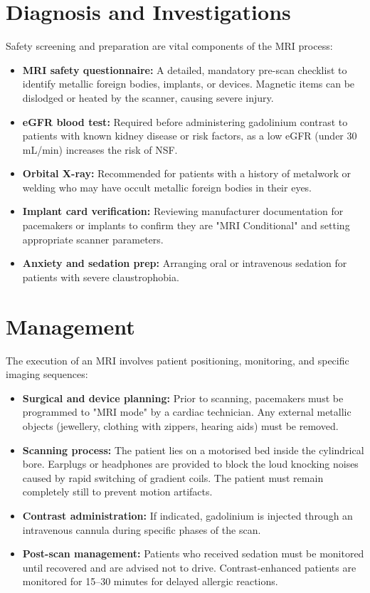 \section*{Diagnosis and Investigations}
Safety screening and preparation are vital components of the MRI process:
\begin{itemize}
    \item \textbf{MRI safety questionnaire:} A detailed, mandatory pre-scan checklist to identify metallic foreign bodies, implants, or devices. Magnetic items can be dislodged or heated by the scanner, causing severe injury.
    \item \textbf{eGFR blood test:} Required before administering gadolinium contrast to patients with known kidney disease or risk factors, as a low eGFR (under 30 mL/min) increases the risk of NSF.
    \item \textbf{Orbital X-ray:} Recommended for patients with a history of metalwork or welding who may have occult metallic foreign bodies in their eyes.
    \item \textbf{Implant card verification:} Reviewing manufacturer documentation for pacemakers or implants to confirm they are "MRI Conditional" and setting appropriate scanner parameters.
    \item \textbf{Anxiety and sedation prep:} Arranging oral or intravenous sedation for patients with severe claustrophobia.
\end{itemize}

\section*{Management}
The execution of an MRI involves patient positioning, monitoring, and specific imaging sequences:
\begin{itemize}
    \item \textbf{Surgical and device planning:} Prior to scanning, pacemakers must be programmed to "MRI mode" by a cardiac technician. Any external metallic objects (jewellery, clothing with zippers, hearing aids) must be removed.
    \item \textbf{Scanning process:} The patient lies on a motorised bed inside the cylindrical bore. Earplugs or headphones are provided to block the loud knocking noises caused by rapid switching of gradient coils. The patient must remain completely still to prevent motion artifacts.
    \item \textbf{Contrast administration:} If indicated, gadolinium is injected through an intravenous cannula during specific phases of the scan.
    \item \textbf{Post-scan management:} Patients who received sedation must be monitored until recovered and are advised not to drive. Contrast-enhanced patients are monitored for 15--30 minutes for delayed allergic reactions.
\end{itemize}

